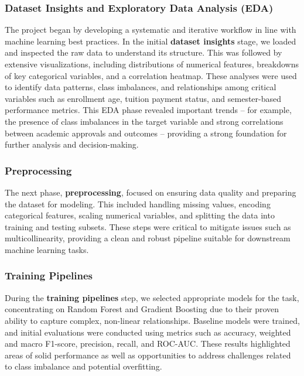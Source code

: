 \documentclass[twoside,final]{hcmut-report}
\begin{document}
\subsubsection*{Dataset Insights and Exploratory Data Analysis (EDA)}
The project began by developing a systematic and iterative workflow in line with machine learning best practices. In the initial \textbf{dataset insights} stage, we loaded and inspected the raw data to understand its structure. This was followed by extensive visualizations, including distributions of numerical features, breakdowns of key categorical variables, and a correlation heatmap. These analyses were used to identify data patterns, class imbalances, and relationships among critical variables such as enrollment age, tuition payment status, and semester-based performance metrics. This EDA phase revealed important trends -- for example, the presence of class imbalances in the target variable and strong correlations between academic approvals and outcomes -- providing a strong foundation for further analysis and decision-making.

\subsubsection*{Preprocessing}
The next phase, \textbf{preprocessing}, focused on ensuring data quality and preparing the dataset for modeling. This included handling missing values, encoding categorical features, scaling numerical variables, and splitting the data into training and testing subsets. These steps were critical to mitigate issues such as multicollinearity, providing a clean and robust pipeline suitable for downstream machine learning tasks.

\subsubsection*{Training Pipelines}
During the \textbf{training pipelines} step, we selected appropriate models for the task, concentrating on Random Forest and Gradient Boosting due to their proven ability to capture complex, non-linear relationships. Baseline models were trained, and initial evaluations were conducted using metrics such as accuracy, weighted and macro F1-score, precision, recall, and ROC-AUC. These results highlighted areas of solid performance as well as opportunities to address challenges related to class imbalance and potential overfitting.
\end{document}

